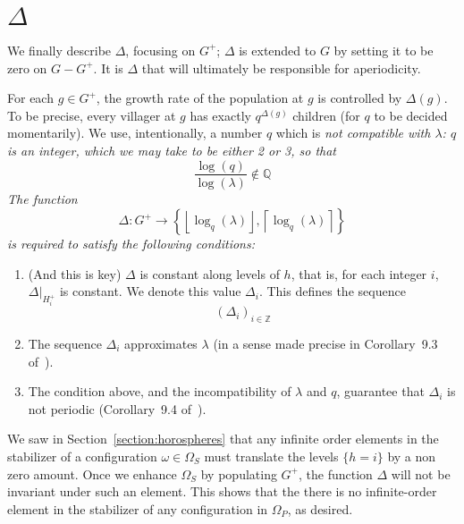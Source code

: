 \documentclass[12pt,reqno]{amsart}
\theoremstyle{plain}
\theoremstyle{definition}
\numberwithin{subcase}{case}
\theoremstyle{plain}
\theoremstyle{definition}
\begin{document}
\section{\(\Delta\)}
\label{section:Delta}

We finally describe \(\Delta\), focusing on \(G^{+}\); \(\Delta\) is extended to \(G\) by setting it to be zero on \(G - G^{+}\).
 It is \(\Delta\) that will ultimately be responsible for aperiodicity.

For each \(g \in G^{+}\), the growth rate of the population at \(g\) is controlled by \(\Delta(g)\). To be precise, every villager at \(g\) has exactly \(q^{\Delta(g)}\) children (for \(q\) to be decided momentarily). 
We use, intentionally, a number \(q\) which is \em not \em compatible with \(\lambda\):  \(q\) is an integer, which we may take to be either 2 or 3, so that
\begin{equation}
\frac{\log(q)}{\log(\lambda)}
\not\in \mathbb{Q}
\end{equation}
The function
\[
\Delta: G^{+} \to 
\left\{
\left\lfloor \log_{q}(\lambda) \right\rfloor, \left \lceil \log_{q}(\lambda)\right \rceil
\right\}
\]
is required to satisfy the following conditions:
\begin{enumerate}

\item (And this is key) \(\Delta\) is constant along levels of \(h\), that is, for each integer \(i\), \(\Delta|_{H^{+}_{i}}\) is constant. We denote this value \(\Delta_{i}\).  This defines the sequence 
\[
\left(\Delta_{i}\right)_{i \in \mathbb{Z}}
\]

\item The sequence \(\Delta_{i}\) approximates \(\lambda\) (in a sense made precise in Corollary~9.3 of~\cite{cohen_goodman-strauss_rieck_2021}).  %

\item The condition above, and the incompatibility of \(\lambda\) and \(q\), guarantee that \(\Delta_{i}\) is not periodic  (Corollary~9.4 of~\cite{cohen_goodman-strauss_rieck_2021}).  
\end{enumerate}

We saw in Section~\ref{section:horospheres} that any infinite order elements in the stabilizer of a configuration \(\omega \in \Omega_{S}\) must translate the levels \(\{h=i\}\) by a non zero amount. Once we enhance \(\Omega_{S}\) by populating \(G^{+}\), the function \(\Delta\) will not be invariant under such an element. This shows that the there is no infinite-order element in the stabilizer of any configuration in \(\Omega_{P}\), as desired. 
\end{document}
